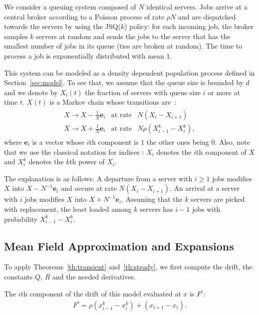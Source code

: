 \documentclass[sigconf]{acmart}
\begin{document}
We consider a queuing system composed of $N$ identical servers. Jobs
arrive at a central broker according to a Poisson process of rate
$\rho N$ and are dispatched towards the servers by using the JSQ($k$)
policy: for each incoming job, the broker samples $k$ servers at
random and sends the jobs to the server that has the smallest number
of jobs in its queue (ties are broken at random). The time to process
a job is exponentially distributed with mean $1$.

This system can be modeled as a density dependent population process
defined in Section~\ref{sec:model}. To see that, we assume that the
queue size is bounded by $d$ and we denote by $X_i(t)$ the fraction of
servers with queue size $i$ or more at time $t$.  $X(t)$ is a Markov
chain whose transitions are~:
\begin{align}
  \label{eq:two-choice-with}
  \begin{array}{rcl}
    X \to X - \frac1N\mathbf{e}_i& \text{at rate} & N(X_i-X_{i+1})\\
    X \to X + \frac1N\mathbf{e}_i& \text{at rate} & N\rho(X^k_{i-1}-X^k_{i}),
  \end{array}
\end{align}
where $\mathbf{e}_i$ is a vector whose $i$th component is $1$ the
other ones being $0$. Also, note that we use the classical notation
for indices : $X_i$ denotes the $i$th component of $X$ and $X_i^k$
denotes the $k$th power of $X_i$.

The explanation is as follows: A departure from a server with $i\ge1$
jobs modifies $X$ into $X-N^{-1}\mathbf{e}_i$ and occurs at rate
$N(X_i-X_{i+1})$.  An arrival at a server with $i$ jobs modifies $X$
into $X+N^{-1}\mathbf{e}_i$.  Assuming that the $k$ servers are picked
with replacement, the least loaded among $k$ servers has $i-1$ jobs
with probability $X_{i-1}^k-X_i^k$.

\subsection{Mean Field Approximation and Expansions}


To apply Theorems~\ref{th:transient} and~\ref{th:steady}, we
first compute the drift, the constants $Q$, $R$ and the needed
derivatives. 

The $i$th component of the drift of this model evaluated at $x$ is
$F^i$:
\begin{align}
  F^i = \rho(x_{i-1}^k-x_i^k) + (x_{i+1}-x_{i}). 
  \label{eq:two-choice-drift}
\end{align}
\end{document}
